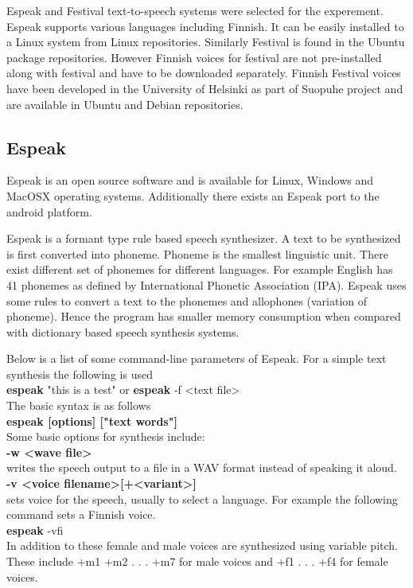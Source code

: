 \documentclass[11pt,a4paper,oneside,article]{memoir}
\begin{document}
Espeak and Festival text-to-speech systems were selected for the experement. Espeak supports various languages including Finnish. It can be easily installed to a Linux system from Linux repositories. Similarly Festival is found in the Ubuntu  package repositories. However Finnish voices for festival are not pre-installed along with festival and have to be downloaded separately. Finnish Festival voices have been developed in the University of Helsinki as part of Suopuhe project and are available in Ubuntu and Debian repositories. 


\subsection{Espeak}

Espeak is an open source software and is available for Linux, Windows and MacOSX operating systems. Additionally there exists an Espeak port to the android platform. 

Espeak is a formant type rule based speech synthesizer. A text to be synthesized is first converted into phoneme. Phoneme is the smallest linguistic unit. There exist different set of phonemes for different languages. For example English has 41 phonemes as defined by International Phonetic Association (IPA). Espeak uses some rules to convert a text to the phonemes and allophones (variation of phoneme). Hence the program has smaller memory consumption when compared with dictionary based speech synthesis systems.


Below is a list of some command-line parameters of Espeak. For a simple text synthesis the following is used\\
\textbf{espeak} "this is a test" or \textbf{espeak} -f <text file>\\
The basic syntax is as follows\\
\textbf{espeak [options] ["text words"]}\\
Some basic options for synthesis include:\\
\textbf{-w <wave file>}\\
writes the speech output to a file in a WAV format instead of speaking it aloud.\\ 
\textbf{-v <voice filename>[+<variant>]}\\
sets voice for the speech, usually to select a language. For example the following command sets a Finnish voice.\\
\textbf{espeak} -vfi\\
In addition to these female and male voices are synthesized using variable pitch. These include +m1 +m2 . . . +m7 for male voices and +f1 . . . +f4 for female voices.
\end{document}
